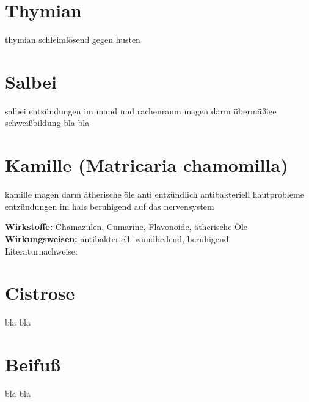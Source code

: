 \section{Thymian}
\label{   }


thymian
schleimlösend
gegen husten


\section{Salbei}
\label{   }



salbei	
entzündungen im mund und rachenraum
magen darm
übermäßige schweißbildung
bla bla


\section{Kamille (Matricaria chamomilla)}
\label{   }


kamille
magen darm
ätherische öle
anti entzündlich
antibakteriell
hautprobleme
entzündungen im hals
beruhigend auf das nervensystem

\textbf{Wirkstoffe:} Chamazulen, Cumarine, Flavonoide, ätherische Öle\\

\textbf{Wirkungsweisen:} antibakteriell, wundheilend, beruhigend\\

Literaturnachweise: \cite{nedoma2018heilsalben}


\section{Cistrose}
\label{   }

bla bla


\section{Beifuß}
\label{   }

bla bla



